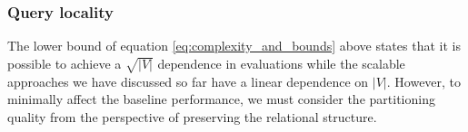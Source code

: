 
\subsubsection{Query locality}
The lower bound of equation \eqref{eq:complexity_and_bounds} above states that it is possible to achieve a $\sqrt{|V|}$ dependence in evaluations while the scalable approaches we have discussed so far have a linear dependence on ${|V|}$. 
However, to minimally affect the baseline performance, we must consider the partitioning quality from the perspective of preserving the relational structure. 

